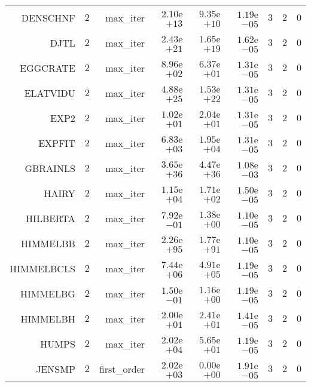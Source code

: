\begin{longtable}{rrrrrrrrr}
DENSCHNF & \(     2\) & max\_iter & \( 2.10\)e\(+13\) & \( 9.35\)e\(+10\) & \( 1.19\)e\(-05\) & \(     3\) & \(     2\) & \(     0\) \\
DJTL & \(     2\) & max\_iter & \( 2.43\)e\(+21\) & \( 1.65\)e\(+19\) & \( 1.62\)e\(-05\) & \(     3\) & \(     2\) & \(     0\) \\
EGGCRATE & \(     2\) & max\_iter & \( 8.96\)e\(+02\) & \( 6.37\)e\(+01\) & \( 1.31\)e\(-05\) & \(     3\) & \(     2\) & \(     0\) \\
ELATVIDU & \(     2\) & max\_iter & \( 4.88\)e\(+25\) & \( 1.53\)e\(+22\) & \( 1.31\)e\(-05\) & \(     3\) & \(     2\) & \(     0\) \\
EXP2 & \(     2\) & max\_iter & \( 1.02\)e\(+01\) & \( 2.04\)e\(+01\) & \( 1.31\)e\(-05\) & \(     3\) & \(     2\) & \(     0\) \\
EXPFIT & \(     2\) & max\_iter & \( 6.83\)e\(+03\) & \( 1.95\)e\(+04\) & \( 1.31\)e\(-05\) & \(     3\) & \(     2\) & \(     0\) \\
GBRAINLS & \(     2\) & max\_iter & \( 3.65\)e\(+36\) & \( 4.47\)e\(+36\) & \( 1.08\)e\(-03\) & \(     3\) & \(     2\) & \(     0\) \\
HAIRY & \(     2\) & max\_iter & \( 1.15\)e\(+04\) & \( 1.71\)e\(+02\) & \( 1.50\)e\(-05\) & \(     3\) & \(     2\) & \(     0\) \\
HILBERTA & \(     2\) & max\_iter & \( 7.92\)e\(-01\) & \( 1.38\)e\(+00\) & \( 1.10\)e\(-05\) & \(     3\) & \(     2\) & \(     0\) \\
HIMMELBB & \(     2\) & max\_iter & \( 2.26\)e\(+95\) & \( 1.77\)e\(+91\) & \( 1.10\)e\(-05\) & \(     3\) & \(     2\) & \(     0\) \\
HIMMELBCLS & \(     2\) & max\_iter & \( 7.44\)e\(+06\) & \( 4.91\)e\(+05\) & \( 1.19\)e\(-05\) & \(     3\) & \(     2\) & \(     0\) \\
HIMMELBG & \(     2\) & max\_iter & \( 1.50\)e\(-01\) & \( 1.16\)e\(+00\) & \( 1.19\)e\(-05\) & \(     3\) & \(     2\) & \(     0\) \\
HIMMELBH & \(     2\) & max\_iter & \( 2.00\)e\(+01\) & \( 2.41\)e\(+01\) & \( 1.41\)e\(-05\) & \(     3\) & \(     2\) & \(     0\) \\
HUMPS & \(     2\) & max\_iter & \( 2.02\)e\(+04\) & \( 5.65\)e\(+01\) & \( 1.19\)e\(-05\) & \(     3\) & \(     2\) & \(     0\) \\
JENSMP & \(     2\) & first\_order & \( 2.02\)e\(+03\) & \( 0.00\)e\(+00\) & \( 1.91\)e\(-05\) & \(     3\) & \(     2\) & \(     0\) \\

\end{longtable}
